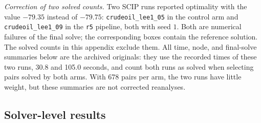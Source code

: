 \emph{Correction of two solved counts.} Two SCIP runs reported optimality with
the value $-79.35$ instead of $-79.75$: \texttt{crudeoil\_lee1\_05} in the control
arm and \texttt{crudeoil\_lee1\_09} in the \texttt{r5} pipeline, both with seed
$1$. Both are numerical failures of the final solve; the corresponding boxes
contain the reference solution. The solved counts in this appendix exclude
them. All time, node, and final-solve summaries below are the archived
originals: they use the recorded times of these two runs, 30.8 and 105.0
seconds, and count both runs as solved when selecting pairs solved by both
arms. With 678 pairs per arm, the two runs have little weight, but these
summaries are not corrected reanalyses.

\subsection{Solver-level results}

